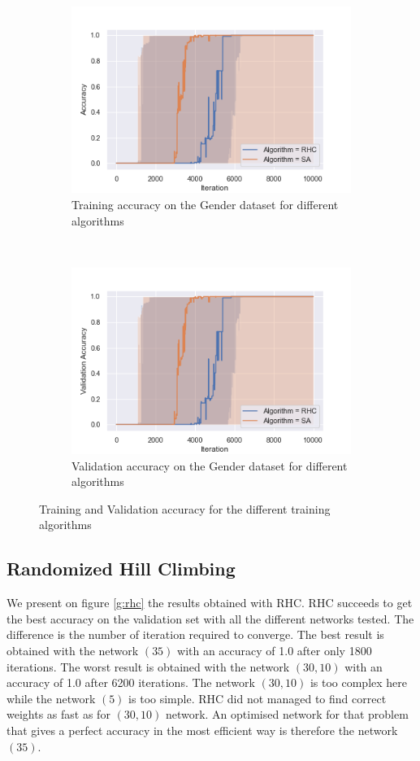 \documentclass[twocolumn, 10pt]{article}
\begin{document}
			\begin{figure}[h]
				\centering
				\begin{subfigure}[t]{\columnwidth}
					\centering
					\includegraphics[width=0.68\linewidth]{../graphics/g_all_Iteration_Error_Algorithm.png}
					\caption{Training accuracy on the Gender dataset for different algorithms}
					\label{g:all_test}
				\end{subfigure}
				~
				\begin{subfigure}[t]{\columnwidth}
					\centering
					\includegraphics[width=0.68\linewidth]{../graphics/g_all_Iteration_Test_Error_Algorithm.png}
					\caption{Validation accuracy on the Gender dataset for different algorithms}
					\label{g:all_val}
				\end{subfigure}
				\caption{Training and Validation accuracy for the different training algorithms}
				\label{g:all}
			\end{figure}
		\subsection{Randomized Hill Climbing}
			We present on figure \ref{g:rhc} the results obtained with RHC. RHC succeeds to get the best accuracy on the validation set with all the different networks tested. The difference is the number of iteration required to converge. The best result is obtained with the network $(35)$ with an accuracy of 1.0 after only 1800 iterations. The worst result is obtained with the network $(30, 10)$ with an accuracy of 1.0 after 6200 iterations. The network $(30, 10)$ is too complex here while the network $(5)$ is too simple. RHC did not managed to find correct weights as fast as for $(30, 10)$ network.  An optimised network for that problem that gives a perfect accuracy in the most efficient way is therefore the network $(35)$.
\end{document}
